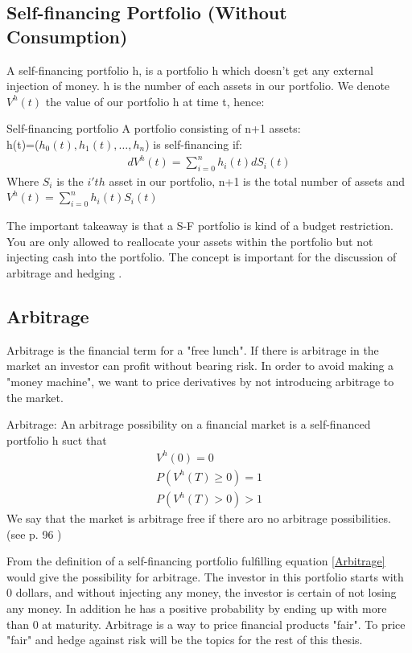 \subsection{Self-financing Portfolio (Without Consumption)}
A self-financing portfolio h, is a portfolio h which doesn't get any external injection of money. h is the number of each assets in our portfolio. We denote $V^{h}(t)$ the value of our portfolio h at time t, hence:
\theoremstyle{definition}
\begin{definition}{Self-financing portfolio}
A portfolio consisting of n+1 assets: \\
h(t)=($h_0(t),h_1(t), \dotsc, h_{n}$) is self-financing if:
\begin{equation}\label{SF}
\begin{split}
dV^{h}(t)=\sum_{i=0}^{n} h_{i}(t) dS_{i}(t)
\end{split}
\end{equation}
Where $S_{i}$ is the $i'th$ asset in our portfolio, n+1 is the total number of assets and\\
$V^{h}(t)=\sum_{i=0}^{n} h_{i}(t) S_{i}(t)$
\end{definition}
The important takeaway is that a S-F portfolio is kind of a budget restriction. You are only allowed to reallocate your assets within the portfolio but not injecting cash into the portfolio. The concept is important for the discussion of arbitrage and hedging \parencite{finKont}.

\subsection{Arbitrage}
Arbitrage is the financial term for a "free lunch". If there is arbitrage in the market an investor can profit without bearing risk. In order to avoid making a "money machine", we want to price derivatives by not introducing arbitrage to the market.  
\theoremstyle{definition}
\begin{definition}{Arbitrage:}
An arbitrage possibility on a financial market is a self-financed portfolio h suct that
\begin{equation}\label{Arbitrage}
\begin{split}
V^{h}(0)=0\\
P(V^{h}(T)\geq 0)=1\\
P(V^{h}(T)>0)>1
\end{split}
\end{equation}
We say that the market is arbitrage free if there aro no arbitrage possibilities.\\
(see p. 96 \parencite{finKont})
\end{definition}
From the definition of a self-financing portfolio fulfilling equation \eqref{Arbitrage} would give the possibility for arbitrage. The investor in this portfolio starts with 0 dollars, and without injecting any money, the investor is certain of not losing any money. In addition he has a positive probability by ending up with more than 0 at maturity. Arbitrage is a way to price financial products "fair". To price "fair" and hedge against risk will be the topics for the rest of this thesis.

